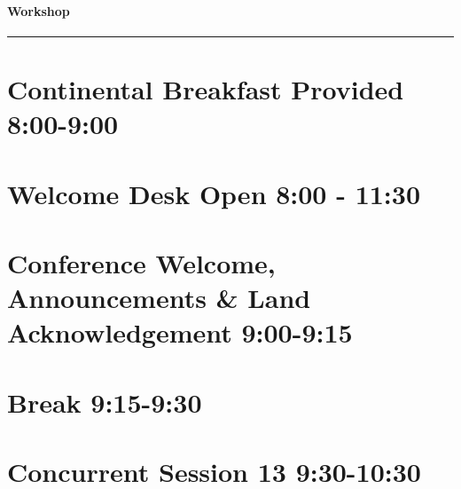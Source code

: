 \documentclass[
]{book}
\begin{document}
\begin{workshop}
\hypertarget{workshop}{%
\paragraph{Workshop}\label{workshop}}
\end{workshop}

\begin{center}\rule{0.5\linewidth}{0.5pt}\end{center}

\hypertarget{continental-breakfast-provided-800-900-2}{%
\section*{Continental Breakfast Provided \textbar{} 8:00-9:00}\label{continental-breakfast-provided-800-900-2}}

\hypertarget{welcome-desk-open-800---1130-2}{%
\section*{Welcome Desk Open \textbar{} 8:00 - 11:30}\label{welcome-desk-open-800---1130-2}}

\hypertarget{conference-welcome-announcements-land-acknowledgement-900-915-2}{%
\section*{Conference Welcome, Announcements \& Land Acknowledgement \textbar{} 9:00-9:15}\label{conference-welcome-announcements-land-acknowledgement-900-915-2}}

\hypertarget{break-915-930-2}{%
\section*{Break \textbar{} 9:15-9:30}\label{break-915-930-2}}

\hypertarget{concurrent-session-13-930-1030}{%
\section*{Concurrent Session 13 \textbar{} 9:30-10:30}\label{concurrent-session-13-930-1030}}
\end{document}
